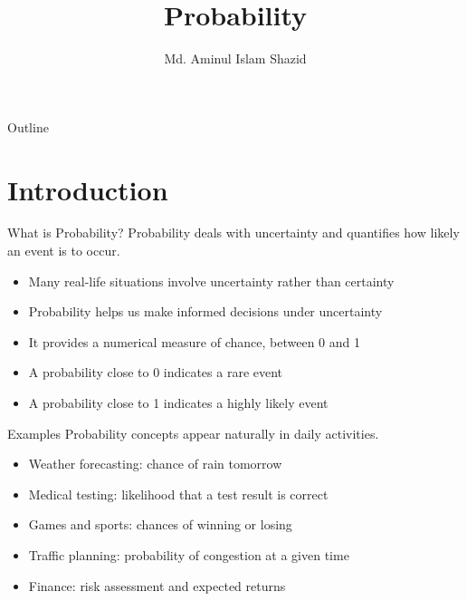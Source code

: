\documentclass[12pt, aspectratio=169]{beamer}
\title{Probability}
\author{Md. Aminul Islam Shazid}
\date{}
\begin{document}
    {
		\addtocounter{framenumber}{-2}    %

		\begin{frame}
			\titlepage
		\end{frame}

		\begin{frame}{Outline}
            \vfill
			\tableofcontents[subsectionstyle=hide]
            \vfill
		\end{frame}
	}

	\section{Introduction}

    \begin{frame}{What is Probability?}
        Probability deals with uncertainty and quantifies how likely an event is to occur.
		\begin{itemize}
			\item Many real-life situations involve uncertainty rather than certainty
			\item Probability helps us make informed decisions under uncertainty
			\item It provides a numerical measure of chance, between 0 and 1
			\item A probability close to 0 indicates a rare event
			\item A probability close to 1 indicates a highly likely event
		\end{itemize}
    \end{frame}


	\begin{frame}{Examples}
		Probability concepts appear naturally in daily activities.
		\begin{itemize}
			\item Weather forecasting: chance of rain tomorrow
			\item Medical testing: likelihood that a test result is correct
			\item Games and sports: chances of winning or losing
			\item Traffic planning: probability of congestion at a given time
			\item Finance: risk assessment and expected returns
		\end{itemize}
	\end{frame}
\end{document}

